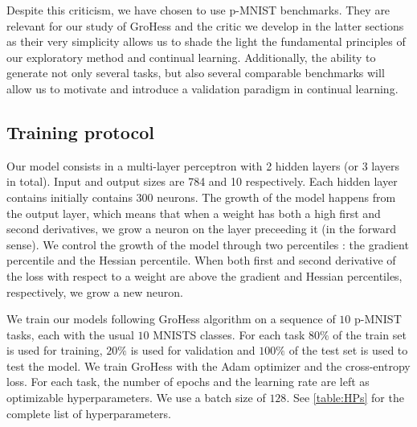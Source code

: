 \documentclass[11pt]{article}
\begin{document}
\vspace{2mm}
\noindent
Despite this criticism, we have chosen to use p-MNIST benchmarks. They are relevant for our study of GroHess and the critic we develop in the latter sections as their very simplicity allows us to shade the light the fundamental principles of our exploratory method and continual learning. Additionally, the ability to generate not only several tasks, but also several comparable benchmarks will allow us to motivate and introduce a validation paradigm in continual learning.


\subsection{Training protocol}


Our model consists in a multi-layer perceptron with 2 hidden layers (or 3 layers in total). Input and output sizes are 784 and 10 respectively. Each hidden layer contains initially contains 300 neurons. The growth of the model happens from the output layer, which means that when a weight has both a high first and second derivatives, we grow a neuron on the layer preceeding it (in the forward sense). We control the growth of the model through two percentiles : the gradient percentile and the Hessian percentile. When both first and second derivative of the loss with respect to a weight are above the gradient and Hessian percentiles, respectively, we grow a new neuron. 

\vspace{2mm}
\noindent
We train our models following GroHess algorithm on a sequence of $10$ p-MNIST tasks, each with the usual $10$ MNISTS classes. For each task $80\%$ of the train set is used for training, $20\%$ is used for validation and $100\%$ of the test set is used to test the model. We train GroHess with the Adam optimizer and the cross-entropy loss. For each task, the number of epochs and the learning rate are left as optimizable hyperparameters. We use a batch size of $128$. See \ref{table:HPs} for the complete list of hyperparameters.
\end{document}
